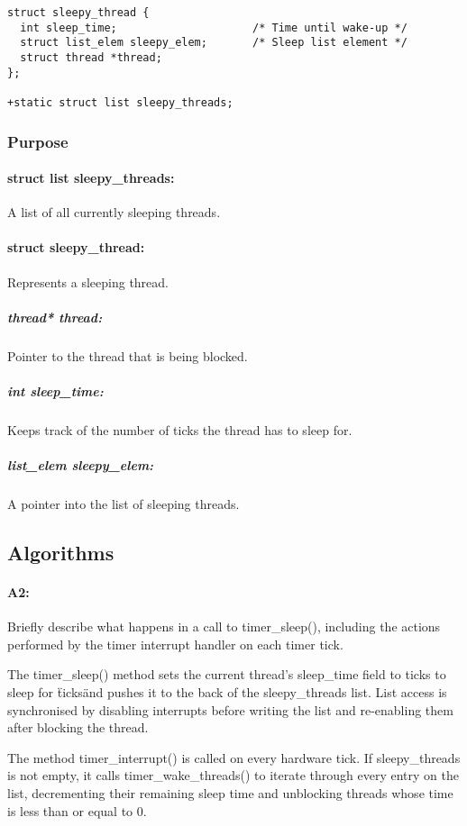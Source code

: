 \documentclass[11pt]{article}
\begin{document}
\begin{verbatim}
struct sleepy_thread {
  int sleep_time;                     /* Time until wake-up */
  struct list_elem sleepy_elem;       /* Sleep list element */
  struct thread *thread;
};

+static struct list sleepy_threads;
\end{verbatim}

\subsubsection{Purpose}
\paragraph{struct list sleepy\_threads:}
A list of all currently sleeping threads.

\paragraph{struct sleepy\_thread:}
Represents a sleeping thread.

\subparagraph{thread* thread:}
Pointer to the thread that is being blocked.
\subparagraph{int sleep\_time:}
Keeps track of the number of ticks the thread has to sleep for.
\subparagraph{list\_elem sleepy\_elem:}
A pointer into the list of sleeping threads.

\subsection{Algorithms}
\paragraph{A2:}
Briefly describe what happens in a call to timer\_sleep(), including the actions
performed by the timer interrupt handler on each timer tick.

The timer\_sleep() method sets the current thread's sleep\_time field to ticks
to sleep for \"ticks\" and pushes it to the back of the sleepy\_threads
list. List access is synchronised by disabling interrupts before writing the
list and re-enabling them after blocking the thread.

The method timer\_interrupt() is called on every hardware tick. If
sleepy\_threads is not empty, it calls timer\_wake\_threads() to iterate through
every entry on the list, decrementing their remaining sleep time and unblocking
threads whose time is less than or equal to 0.
\end{document}
